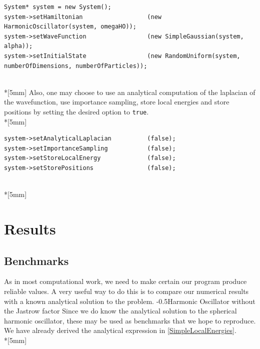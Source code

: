 \documentclass[english, a4paper]{article}
\makeatletter
\renewcommand{\subsubsection}{\@startsection{subsubsection}{3}{0pt}%
{-\baselineskip}{0.5\baselineskip}{\bf\large}}
\makeatother
\begin{document}
\begin{verbatim}
System* system = new System();
system->setHamiltonian                  (new HarmonicOscillator(system, omegaHO));
system->setWaveFunction                 (new SimpleGaussian(system, alpha));
system->setInitialState                 (new RandomUniform(system, numberOfDimensions, numberOfParticles));
\end{verbatim}
\\*[5mm]
Also, one may choose to use an analytical computation of the laplacian of the wavefunction, use importance sampling, store local energies and store positions by setting the desired option to \texttt{true}.\\*[5mm]
\begin{verbatim}
system->setAnalyticalLaplacian          (false);
system->setImportanceSampling           (false);
system->setStoreLocalEnergy             (false);
system->setStorePositions               (false);
\end{verbatim}
\\*[5mm]


\section{Results}


\subsection{Benchmarks}
As in most computational work, we need to make certain our program produce reliable values. 
A very useful way to do this is to compare our numerical results with a known analytical solution to the problem. 
\subsubsection{Harmonic Oscillator without the Jastrow factor}
Since we do know the analytical solution to the spherical harmonic oscillator, these may be used as benchmarks that we hope to reproduce.
We have already derived the analytical expression in \eqref{SimpleLocalEnergies}. \\*[5mm]
\end{document}
